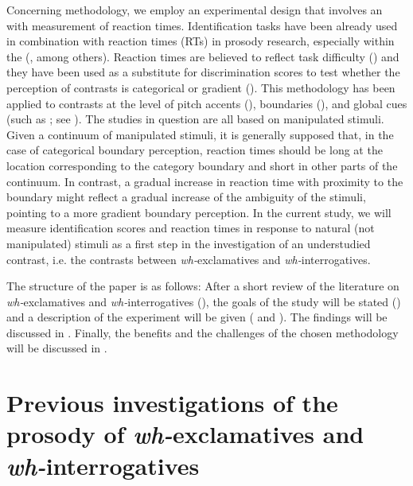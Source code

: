 \documentclass[output=paper]{langsci/langscibook}
\begin{document}
Concerning methodology, we employ an experimental design that involves an  with measurement of reaction times. Identification tasks have been already used in combination with reaction times (RTs) in prosody research, especially within the  (\citealt{Chen2003,Fale2006,Niebuhr2007,Feldhausen2011}, among others). Reaction times are believed to reflect task difficulty (\citealt{Massaro1987}) and they have been used as a substitute for discrimination scores to test whether the perception of  contrasts is categorical or gradient (\citealt{Chen2003,Niebuhr2007}). This methodology has been applied to contrasts at the level of pitch accents (\citealt{Chen2003,Niebuhr2007,Feldhausen2011}),  boundaries (\citealt{Schneider2011,Petrone2017}), and global  cues (such as ; see \citealt{Borras-Comes2010}). The studies in question are all based on manipulated stimuli. Given a continuum of manipulated stimuli, it is generally supposed that, in the case of categorical boundary perception, reaction times should be long at the location corresponding to the category boundary and short in other parts of the continuum. In contrast, a gradual increase in reaction time with proximity to the boundary might reflect a gradual increase of the ambiguity of the stimuli, pointing to a more gradient boundary perception. In the current study, we will measure identification scores and reaction times in response to natural (not manipulated) stimuli as a first step in the investigation of an understudied  contrast, i.e. the contrasts between \textit{wh-}exclamatives and \textit{wh-}interrogatives.

The structure of the paper is as follows: After a short review of the literature on \textit{wh-}exclamatives and \textit{wh-}interrogatives (), the goals of the study will be stated () and a description of the experiment will be given ( and ). The findings will be discussed in . Finally, the benefits and the challenges of the chosen methodology will be discussed in .


\section{Previous investigations of the prosody of \textit{wh-}exclamatives and \textit{wh-}interrogatives}
\label{sec:kel:2}
\end{document}
